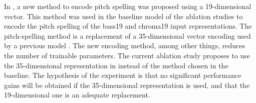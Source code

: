 
In , a new method to encode
pitch spelling was proposed using a 19-dimensional vector.
This method was used in the baseline model of the ablation
studies to encode the pitch spelling of the \gls{bass19} and
\gls{chroma19} input representations. The pitch-spelling
method is a replacement of a 35-dimensional vector encoding
used by a previous model \parencite{micchi2021deep}. The new
encoding method, among other things, reduces the number of
trainable parameters. The current ablation study proposes to
use the 35-dimensional representation in
\textcite{micchi2021deep} instead of the method chosen in
the baseline. The hypothesis of the experiment is that no
significant performance gains will be obtained if the
35-dimensional representation is used, and that the
19-dimensional one is an adequate replacement.
